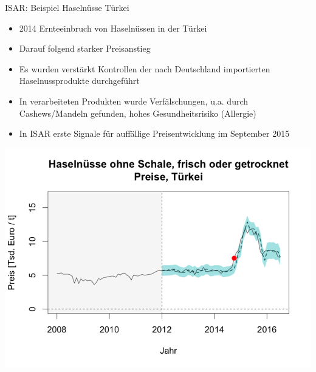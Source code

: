 \documentclass[
  10pt,
  ignorenonframetext,
]{beamer}
\providecommand{\tightlist}{%
  \setlength{\itemsep}{0pt}\setlength{\parskip}{0pt}}
\begin{document}
\begin{frame}{ISAR: Beispiel Haselnüsse Türkei}
\label{isar-beispiel-haselnuxfcsse-tuxfcrkei}
\begin{itemize}
\tightlist
\item
  2014 Ernteeinbruch von Haselnüssen in der Türkei
\item
  Darauf folgend starker Preisanstieg
\item
  Es wurden verstärkt Kontrollen der nach Deutschland importierten
  Haselnussprodukte durchgeführt
\item
  In verarbeiteten Produkten wurde Verfälschungen, u.a. durch
  Cashews/Mandeln gefunden, hohes Gesundheitsrisiko (Allergie)
\item
  In ISAR erste Signale für auffällige Preisentwicklung im September
  2015
\end{itemize}

\begin{center}
\includegraphics[width=.6\textwidth]{pics/Haselnuesse_03} \\
\end{center}
\end{frame}
\end{document}

